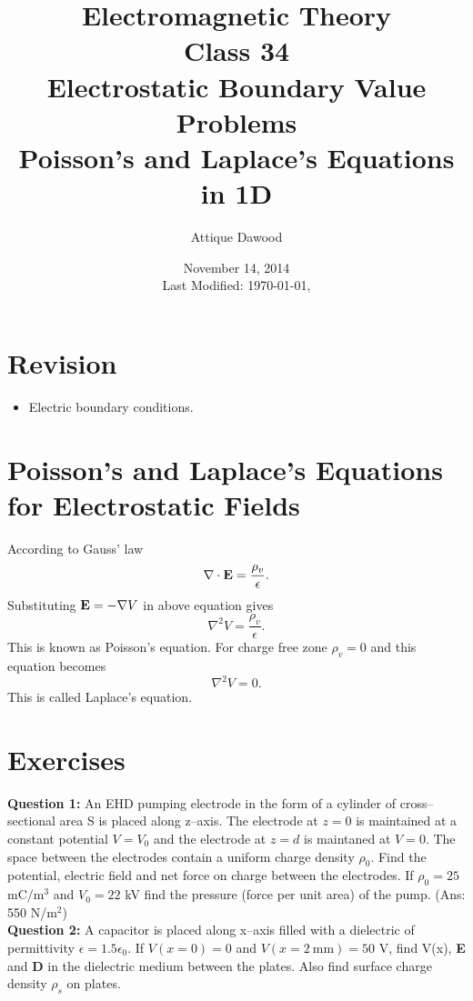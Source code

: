 \documentclass[12pt,a4paper]{article}
\title{Electromagnetic Theory\\Class 34\\Electrostatic Boundary Value Problems\\Poisson's and Laplace's Equations in 1D}
\author{Attique Dawood}
\date{November 14, 2014\\[0.2cm] Last Modified: \today, \currenttime}
\begin{document}
\maketitle
\section{Revision}
\begin{itemize}
\item Electric boundary conditions.
\end{itemize}
\section{Poisson's and Laplace's Equations for Electrostatic Fields}
According to Gauss' law
\begin{equation}
\nabla\cdot\mathrm{\textbf E}=\dfrac{\rho_v}{\epsilon}.
\end{equation}
Substituting $\mathrm{\textbf E}=-\nabla V$ in above equation gives
\begin{equation}
\nabla^2V=\dfrac{\rho_v}{\epsilon}.
\end{equation}
This is known as Poisson's equation. For charge free zone $\rho_v=0$ and this equation becomes
\begin{equation}
\nabla^2V=0.
\end{equation}
This is called Laplace's equation.
\section{Exercises}
\noindent\textbf{Question 1:} An EHD pumping electrode in the form of a cylinder of cross--sectional area S is placed along z--axis. The electrode at $z=0$ is maintained at a constant potential $V=V_0$ and the electrode at $z=d$ is maintaned at $V=0$. The space between the electrodes contain a uniform charge density $\rho_0$. Find the potential, electric field and net force on charge between the electrodes. If $\rho_0=25$ mC/m$^3$ and $V_0=22$ kV find the pressure (force per unit area) of the pump. (Ans: 550 N/m$^2$)\\[0.2cm]
\noindent\textbf{Question 2:} A capacitor is placed along x--axis filled with a dielectric of permittivity $\epsilon=1.5\epsilon_0$. If $V(x=0)=0$ and $V(x=2\mathrm{~mm})=50$ V, find V(x), \textbf{E} and \textbf{D} in the dielectric medium between the plates. Also find surface charge density $\rho_s$ on plates.
%
%
\end{document}
